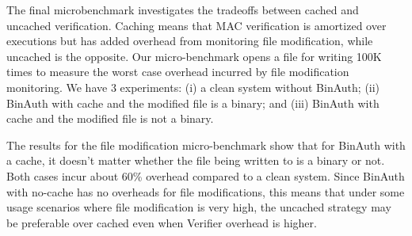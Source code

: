 The final microbenchmark investigates the tradeoffs between cached
and uncached verification.
Caching means that MAC verification is amortized over executions
but has added overhead from monitoring file modification,
while uncached is the opposite.
Our micro-benchmark opens a file for writing 100K times to
measure the worst case overhead incurred by file modification monitoring.
We have 3 experiments:
(i) a clean system without BinAuth;
(ii) BinAuth with cache and the modified file is a binary;
and (iii) BinAuth with cache and the modified file
is not a binary.

The results for the file modification micro-benchmark
show that for BinAuth with a cache, it
doesn't matter whether the file being written to is a binary or not.
Both cases incur about 60\% overhead compared to a clean system.
Since BinAuth with no-cache has no overheads for file
modifications, this means that under some usage scenarios where file modification
is very high,
the uncached strategy may be preferable over cached even when Verifier overhead
is higher.


